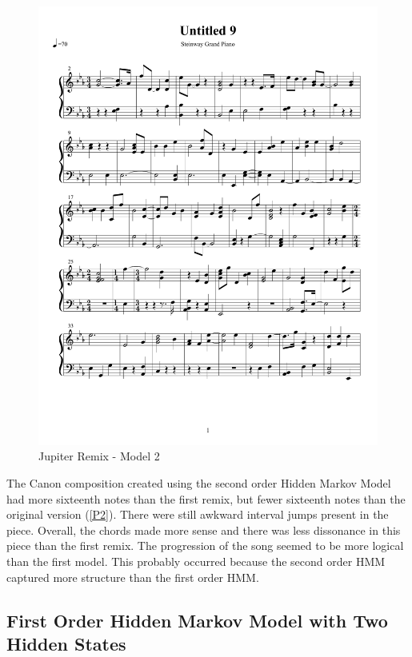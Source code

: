 \documentclass{article} %
\begin{document}
\begin{figure}[H]
\centering

\includegraphics [scale = 0.6] {JupiterRemix2-cropped.pdf}
\caption{Jupiter Remix - Model 2\label{J2}}
\end{figure}

The Canon composition created using the second order Hidden Markov Model had more sixteenth notes than the first remix, but fewer sixteenth notes than the original version ({\autoref{P2}}). There were still awkward interval jumps present in the piece. Overall, the chords made more sense and there was less dissonance in this piece than the first remix. The progression of the song seemed to be more logical than the first model. This probably occurred because the second order HMM captured more structure than the first order HMM.

\subsection{First Order Hidden Markov Model with Two Hidden States}
\end{document}
